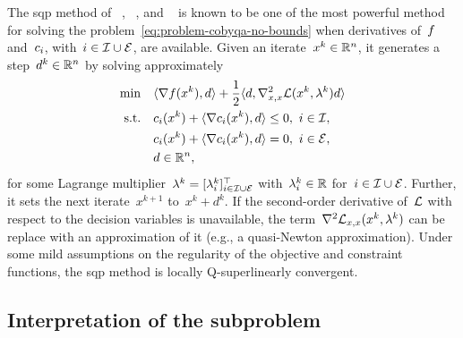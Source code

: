 The \gls{sqp} method of \citeauthor{Wilson_1963}~\cite{Wilson_1963}, \citeauthor{Han_1976}~\cite{Han_1976,Han_1977}, and \citeauthor{Powell_1978a}~\cite{Powell_1978a,Powell_1978b} is known to be one of the most powerful method for solving the problem~\cref{eq:problem-cobyqa-no-bounds} when derivatives of~$f$ and~$c_{i}$, with~$i \in \mathcal{I} \cup \mathcal{E}$, are available.
Given an iterate~$x^k \in \mathbb{R}^n$, it generates a step~$d^k \in \mathbb{R}^n$ by solving approximately
\begin{subequations}
    \label{eq:sqp-subproblem}
    \begin{align}
        \min        & \quad \inner{\nabla \obj(x^k), d} + \frac{1}{2} \inner{d, \nabla_{x, x}^2 \lag(x^k, \lambda^k) d} \label{eq:sqp-subproblem-obj}\\
        \text{s.t.} & \quad \con{i}(x^k) + \inner{\nabla \con{i}(x^k), d} \le 0, ~ i \in \iub,\\
                    & \quad \con{i}(x^k) + \inner{\nabla \con{i}(x^k), d} = 0, ~ i \in \ieq,\\
                    & \quad d \in \R^n,
    \end{align}
\end{subequations}
for some Lagrange multiplier~$\lambda^k = [\lambda_i^k]_{i \in \mathcal{I} \cup \mathcal{E}}^{\top}$ with~$\lambda_i^k \in \mathbb{R}$ for~$i \in \mathcal{I} \cup \mathcal{E}$.
Further, it sets the next iterate~$x^{k + 1}$ to~$x^k + d^k$.
If the second-order derivative of~$\lag$ with respect to the decision variables is unavailable, the term~$\nabla^2 \lag_{x, x}(x^k, \lambda^k)$ can be replace with an approximation of it (e.g., a quasi-Newton approximation).
Under some mild assumptions on the regularity of the objective and constraint functions, the \gls{sqp} method is locally Q-superlinearly convergent.

\subsection{Interpretation of the subproblem}

